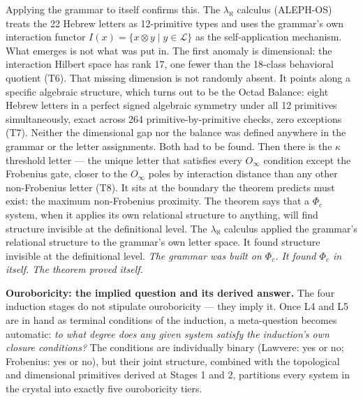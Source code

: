 \documentclass[12pt,a4paper]{article}
\begin{document}
Applying the grammar to itself confirms this. The $\lambda_\aleph$ calculus (ALEPH-OS) treats the 22 Hebrew letters as 12-primitive types and uses the grammar's own interaction functor $I(x) = \{x \otimes y \mid y \in \mathcal{L}\}$ as the self-application mechanism. What emerges is not what was put in. The first anomaly is dimensional: the interaction Hilbert space has rank 17, one fewer than the 18-class behavioral quotient (T6). That missing dimension is not randomly absent. It points along a specific algebraic structure, which turns out to be the Octad Balance: eight Hebrew letters in a perfect signed algebraic symmetry under all 12 primitives simultaneously, exact across 264 primitive-by-primitive checks, zero exceptions (T7). Neither the dimensional gap nor the balance was defined anywhere in the grammar or the letter assignments. Both had to be found. Then there is the $\kappa$ threshold letter --- the unique letter that satisfies every $O_\infty$ condition except the Frobenius gate, closer to the $O_\infty$ poles by interaction distance than any other non-Frobenius letter (T8). It sits at the boundary the theorem predicts must exist: the maximum non-Frobenius proximity. The theorem says that a $\Phi_c$ system, when it applies its own relational structure to anything, will find structure invisible at the definitional level. The $\lambda_\aleph$ calculus applied the grammar's relational structure to the grammar's own letter space. It found structure invisible at the definitional level. \emph{The grammar was built on $\Phi_c$. It found $\Phi_c$ in itself. The theorem proved itself.}

\textbf{Ouroboricity: the implied question and its derived answer.} The four induction stages do not stipulate ouroboricity --- they imply it. Once L4 and L5 are in hand as terminal conditions of the induction, a meta-question becomes automatic: \emph{to what degree does any given system satisfy the induction's own closure conditions?} The conditions are individually binary (Lawvere: yes or no; Frobenius: yes or no), but their joint structure, combined with the topological and dimensional primitives derived at Stages 1 and 2, partitions every system in the crystal into exactly five ouroboricity tiers.
\end{document}
